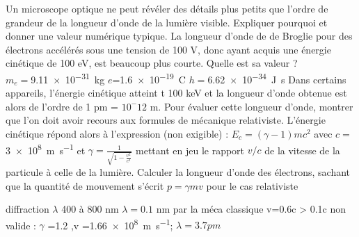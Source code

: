 \begin{Exercise}[title=Microscopie électronique.]
  \Question Un microscope optique ne peut révéler des détails plus petits que l’ordre de grandeur de la longueur d’onde de la lumière visible. Expliquer pourquoi et  donner une valeur numérique typique.
\Question La longueur d’onde de de Broglie pour des électrons accélérés sous une tension de 100 V, donc ayant acquis une énergie cinétique de 100 eV, est beaucoup plus courte. Quelle est sa valeur ?\\
$m_e=$\SI{9.11e-31}{kg} $e$=\SI{1.6e-19}{C} $h=$\SI{6.62e-34}{J.s}
\Question Dans certains appareils, l’énergie cinétique atteint
t 100 keV et la longueur d’onde obtenue est alors de l’ordre de 1 pm = $10^-12$ m. Pour évaluer cette longueur d’onde, montrer que l’on doit avoir recours aux formules de mécanique relativiste.
L’énergie cinétique répond alors à l’expression (non exigible) : $E_c= (\gamma-1)mc^2$ avec $c=$\SI{3e8}{\m\per\s} et $\gamma=\frac{1}{\sqrt{1-\frac{v^2}{c^2}}}$ mettant en jeu le rapport $v/c$ de la vitesse de la particule à celle de la lumière. Calculer la longueur d’onde  des électrons, sachant que la quantité de mouvement s’écrit $p =\gamma mv$  pour le cas relativiste
\end{Exercise}
\begin{Answer}
\Question diffraction $\lambda$ 400 à 800 nm
\Question $\lambda =0.1$ nm
\Question par la méca classique v=0.6c > 0.1c non valide : $\gamma$ =1.2 ,v =\SI{1.66e8}{\m\per\s}; $\lambda=3.7pm$
\end{Answer}
